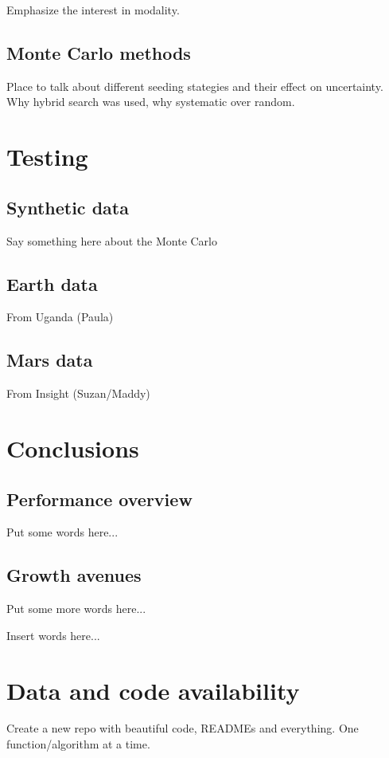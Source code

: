 \documentclass[preprint]{seismica}
\begin{document}
      \noindent Emphasize the interest in modality.

    \subsection{Monte Carlo methods}
      Place to talk about different seeding stategies and their effect on uncertainty.
      Why hybrid search was used, why systematic over random.


\section{Testing} \label{sec:example}

    \subsection{Synthetic data}
      Say something here about the Monte Carlo
    
    \subsection{Earth data}
      From Uganda (Paula)

    \subsection{Mars data}
      From Insight (Suzan/Maddy)

\section{Conclusions} \label{sec:conclusion}

    \subsection{Performance overview}
      Put some words here...

    \subsection{Growth avenues}
      Put some more words here...

\begin{acknowledgements}
    [Suzan] Insert words here...
\end{acknowledgements}

\section*{Data and code availability}
Create a new repo with beautiful code, READMEs and everything. One function/algorithm at a time.
\end{document}
